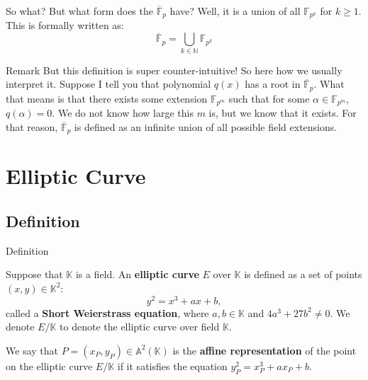 \documentclass{zkdl-presentation-template}
\begin{document}
    \begin{frame}{So what?}
        But what form does the $\overline{\mathbb{F}}_{p}$ have? Well, it is a union of all $\mathbb{F}_{p^k}$ for $k \geq 1$. This is formally written as:
        \begin{equation*}
            \boxed{\overline{\mathbb{F}}_{p} = \bigcup_{k \in \mathbb{N}} \mathbb{F}_{p^k}}
        \end{equation*} 

        \begin{block}{Remark}
            But this definition is super counter-intuitive! So here how we usually interpret it. Suppose I tell you that polynomial $q(x)$ has a root in $\overline{\mathbb{F}}_p$. What that means is that there exists some extension $\mathbb{F}_{p^m}$ such that for some $\alpha \in \mathbb{F}_{p^m}$, $q(\alpha)=0$. We do not know how large this $m$ is, but we know that it exists. For that reason, $\overline{\mathbb{F}}_p$ is defined as an infinite union of all possible field extensions.
        \end{block}
    \end{frame}

    \section{Elliptic Curve}

    \subsection{Definition}
    \begin{frame}{Definition}
        
        \begin{definition}
            Suppose that $\mathbb{K}$ is a field. An \textbf{elliptic curve} $E$ over $\mathbb{K}$ is defined as a set of points $(x,y) \in \mathbb{K}^2$:
            \begin{equation*}
                y^2 = x^3+ax+b,
            \end{equation*}
            called a \textbf{Short Weierstrass equation}, where $a,b \in \mathbb{K}$ and $4a^3+27b^2 \neq 0$. We denote $E/\mathbb{K}$ to denote the elliptic curve over field $\mathbb{K}$.
        \end{definition}

        \begin{definition}
            We say that $P=(x_P,y_P) \in \mathbb{A}^2(\mathbb{K})$ is the \textbf{affine representation} of the point on the elliptic curve $E/\mathbb{K}$ if it satisfies the equation $y_P^2=x_P^3+ax_P+b$.
        \end{definition}
    \end{frame}
\end{document}
